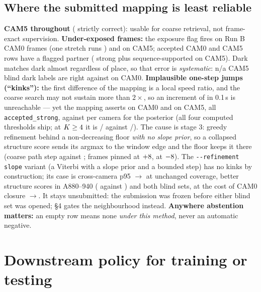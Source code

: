 \documentclass[10pt,a4paper]{article}
\providecommand{\VthreebDarkCamFiveCount}{n/a}
\begin{document}
\subsection{Where the submitted mapping is least reliable}

\textbf{CAM5 throughout} (\VthreebVtwoCount{} strictly correct): usable for coarse
retrieval, not frame-exact supervision. \textbf{Under-exposed frames:} the
exposure flag fires on \DarkRunBCamZero{} Run B CAM0 frames (one stretch runs
\DarkLongestStretch{}) and \DarkRunBCamFive{} on CAM5; \DarkAcceptedCamZero{}
accepted CAM0 and \DarkAcceptedCamFive{} CAM5 rows have a flagged partner
(\DarkStrongCamFive{} strong plus \DarkSequenceCamFive{} sequence-supported on CAM5). Dark matches dark almost
regardless of place, so that error is \emph{systematic}:
\VthreebDarkCamFiveCount{} CAM5 blind dark labels are right against
\VthreeDarkCamZeroCount{} on CAM0. \textbf{Implausible one-step jumps
(``kinks''):} the first difference of the mapping is a local speed ratio, and
the coarse search may not sustain more than $2\times$, so an increment of
\KinkThreshold{} in 0.1\,s is unreachable --- yet the mapping asserts
\KinkCamZero{} on CAM0 and \KinkCamFive{} on CAM5, all \texttt{accepted\_strong},
against \KinkPosteriorCamZero{} per camera for the posterior (all four computed
thresholds ship; at $K\ge4$ it is \KinkLowCamZero{}/%
\KinkLowCamFive{} against \KinkLowPosteriorCamZero{}/\KinkLowPosteriorCamFive{}).
The cause is stage 3: greedy refinement behind a non-decreasing floor \emph{with
no slope prior}, so a collapsed structure score sends its argmax to the window
edge and the floor keeps it there (coarse path step \KinkCoarseMaxStep{} against
\KinkRefinedMaxStep{}; \KinkPinnedFrames{} frames pinned at $+8$,
\KinkPinnedFramesMinus{} at $-8$). The \texttt{-{}-refinement
slope} variant (a Viterbi with a slope prior and a bounded step) has no kinks by
construction; its case is cross-camera p95
\BaselinePninetyfive{}$\to$\SlopePninetyfive{} at unchanged coverage, better
structure scores in A880--940 (\SlopeWindowScore{} against
\SubmittedWindowScore{}) and both blind sets, at the cost of CAM0 closure
\BaselineClosureCamZero$\to$\SlopeClosureCamZero{}. It stays unsubmitted: the
submission was frozen before either blind set was opened; \S4 gates the
neighbourhood instead. \textbf{Anywhere abstention matters:} an empty
row means none \emph{under this method}, never an automatic negative.

\section{Downstream policy for training or testing}
\end{document}
